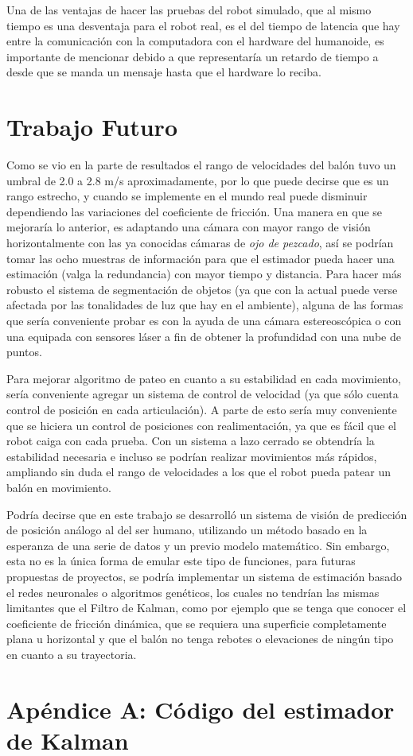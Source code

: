 	Una de las ventajas de hacer las pruebas del robot simulado, que al mismo tiempo es una desventaja para el robot real, es el del tiempo de latencia que hay entre la comunicación con la computadora con el hardware del humanoide, es importante de mencionar debido a que representaría un retardo de tiempo a desde que se manda un mensaje hasta que el hardware lo reciba. 
	

	
\section{Trabajo Futuro}
	Como se vio en la parte de resultados el rango de velocidades del balón tuvo un umbral de 2.0 a 2.8 m/s aproximadamente, por lo que puede decirse que es un rango estrecho, y cuando se implemente en el mundo real puede disminuir dependiendo las variaciones del coeficiente de fricción. Una manera en que se mejoraría lo anterior, es adaptando una cámara con mayor rango de visión horizontalmente con las ya conocidas cámaras de \textit{ojo de pezcado}, así se podrían tomar las ocho muestras de información para que el estimador pueda hacer una estimación (valga la redundancia) con mayor tiempo y distancia. Para hacer más robusto el sistema de segmentación de objetos (ya que con la actual puede verse afectada por las tonalidades de luz que hay en el ambiente), alguna de las formas que sería conveniente probar es con la ayuda de una cámara estereoscópica o con una equipada con sensores láser a fin de obtener la profundidad con una nube de puntos.

	Para mejorar algoritmo de pateo en cuanto a su estabilidad en cada movimiento, sería conveniente agregar un sistema de control de velocidad (ya que sólo cuenta control de posición en cada articulación). A parte de esto sería muy conveniente que se hiciera un control de posiciones con realimentación, ya que es fácil que el robot caiga con cada prueba. Con un sistema a lazo cerrado se obtendría la estabilidad necesaria e incluso se podrían realizar movimientos más rápidos, ampliando sin duda el rango de velocidades a los que el robot pueda patear un balón en movimiento. 
		
	Podría decirse que en este trabajo se desarrolló un sistema de visión de predicción de posición análogo al del ser humano, utilizando un método basado en la esperanza de una serie de datos y un previo modelo matemático. Sin embargo, esta no es la única forma de emular este tipo de funciones, para futuras propuestas de proyectos, se podría implementar un sistema de estimación basado el redes neuronales o algoritmos genéticos, los cuales no tendrían las mismas limitantes que el Filtro de Kalman, como por ejemplo que se tenga que conocer el coeficiente de fricción dinámica, que se requiera una superficie completamente plana u horizontal y que el balón no tenga rebotes o elevaciones de ningún tipo en cuanto a su trayectoria.

\appendix
\section{Apéndice A: Código del estimador de Kalman}
